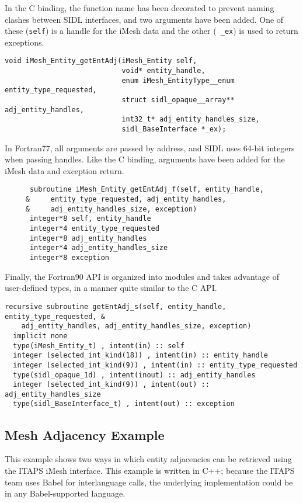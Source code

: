 In the C binding, the function name has been decorated to prevent naming
clashes between SIDL interfaces, and two arguments have been added.  One
of these ({\tt self}) is a handle for the iMesh data and the other ({\tt
\_ex}) is used to return exceptions. 
\begin{verbatim}
void iMesh_Entity_getEntAdj(iMesh_Entity self,
                            void* entity_handle,
                            enum iMesh_EntityType__enum entity_type_requested,
                            struct sidl_opaque__array** adj_entity_handles,
                            int32_t* adj_entity_handles_size,
                            sidl_BaseInterface *_ex);
\end{verbatim}

In Fortran77, all arguments are passed by address, and SIDL uses 64-bit
integers when passing handles.  Like the C binding, arguments have been
added for the iMesh data and exception return.
\begin{verbatim}
      subroutine iMesh_Entity_getEntAdj_f(self, entity_handle,
     &     entity_type_requested, adj_entity_handles,
     &     adj_entity_handles_size, exception)
      integer*8 self, entity_handle
      integer*4 entity_type_requested
      integer*8 adj_entity_handles
      integer*4 adj_entity_handles_size
      integer*8 exception
\end{verbatim}

Finally, the Fortran90 API is organized into modules and takes advantage
of user-defined types, in a manner quite similar to the C API.
\begin{verbatim}
recursive subroutine getEntAdj_s(self, entity_handle, entity_type_requested, &
    adj_entity_handles, adj_entity_handles_size, exception)
  implicit none
  type(iMesh_Entity_t) , intent(in) :: self
  integer (selected_int_kind(18)) , intent(in) :: entity_handle
  integer (selected_int_kind(9)) , intent(in) :: entity_type_requested
  type(sidl_opaque_1d) , intent(inout) :: adj_entity_handles
  integer (selected_int_kind(9)) , intent(out) :: adj_entity_handles_size
  type(sidl_BaseInterface_t) , intent(out) :: exception
\end{verbatim}


\subsection{Mesh Adjacency Example}

This example shows two ways in which entity adjacencies can be retrieved
using the ITAPS iMesh interface.  This example is written in C++; because the
ITAPS team uses Babel for interlanguage calls, the underlying 
implementation could be in any Babel-supported language.  

